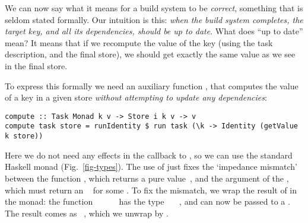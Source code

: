 We can now say what it means for a build system to be \emph{correct}, something
that is seldom stated formally. Our intuition is this: \emph{when the build
system completes, the target key, and all its dependencies, should be up to
date}. What does ``up to date'' mean? It means that if we recompute the value of
the key (using the task description, and the final store), we should get exactly
the same value as we see in the final store.

To express this formally we need an auxiliary function , that
computes the value of a key in a given store \emph{without attempting to update
any dependencies}:

\begin{verbatim}
compute :: Task Monad k v -> Store i k v -> v
compute task store = runIdentity $ run task (\k -> Identity (getValue k store))
\end{verbatim}

\noindent
Here we do not need any effects in the  callback to , so
we can use the standard Haskell  monad (Fig.~\ref{fig-types}).
The use of  just fixes the `impedance mismatch' between the
function , which returns a pure value~, and the 
argument of the , which must return an ~ for some .
To fix the mismatch, we wrap the result of  in the 
monad: the function
\hs{\@@k}~\hs{->}~~~~ has the type
~\hs{->}~~, and can now be passed to a . The
result comes as ~, which we unwrap by .

